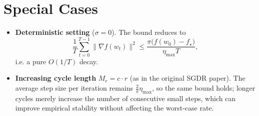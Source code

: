 \documentclass{article}
\begin{document}
\section*{Special Cases}
\begin{itemize}
\item \textbf{Deterministic setting} ($\sigma=0$). The bound reduces to
\[
\frac{1}{T}\sum_{t=0}^{T-1}\|\nabla f(w_t)\|^2\le\frac{\pi\big(f(w_0)-f_\star\big)}{\eta_{\max}T},
\]
i.e. a pure $O(1/T)$ decay.
\item \textbf{Increasing cycle length} $M_r=c\cdot r$ (as in the original SGDR paper). The average step size per iteration remains $\frac{2}{\pi}\eta_{\max}$, so the same bound holds; longer cycles merely increase the number of consecutive small steps, which can improve empirical stability without affecting the worst‑case rate.
\end{itemize}
\end{document}
